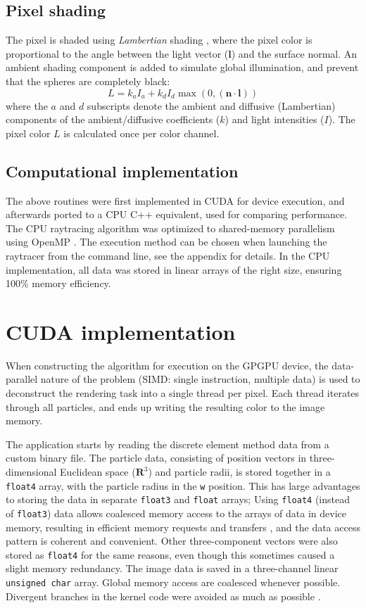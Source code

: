 \documentclass[journal]{IEEEtran}
\begin{document}
\subsection{Pixel shading}
The pixel is shaded using \emph{Lambertian} shading \cite{Shirley:2009}, where the pixel color is proportional to the angle between the light vector ($\mathbf{l}$) and the surface normal. An ambient shading component is added to simulate global illumination, and prevent that the spheres are completely black:
\begin{equation}
  L = k_a I_a + k_d I_d \max(0,(\mathbf{n}\cdot\mathbf{l}))
  \label{eq:shading}
\end{equation}
where the $a$ and $d$ subscripts denote the ambient and diffusive (Lambertian) components of the ambient/diffusive coefficients ($k$) and light intensities ($I$). The pixel color $L$ is calculated once per color channel.


\subsection{Computational implementation}
The above routines were first implemented in CUDA for device execution, and afterwards ported to a CPU C++ equivalent, used for comparing performance. The CPU raytracing algorithm was optimized to shared-memory parallelism using OpenMP \cite{Chapman:2007}. The execution method can be chosen when launching the raytracer from the command line, see the appendix for details. In the CPU implementation, all data was stored in linear arrays of the right size, ensuring 100\% memory efficiency.


\section{CUDA implementation}
When constructing the algorithm for execution on the GPGPU device, the data-parallel nature of the problem (SIMD: single instruction, multiple data) is used to deconstruct the rendering task into a single thread per pixel. Each thread iterates through all particles, and ends up writing the resulting color to the image memory.

The application starts by reading the discrete element method data from a custom binary file. The particle data, consisting of position vectors in three-dimensional Euclidean space ($\mathbf{R}^3$) and particle radii, is stored together in a \texttt{float4} array, with the particle radius in the \texttt{w} position. This has large advantages to storing the data in separate \texttt{float3} and \texttt{float} arrays; Using \texttt{float4} (instead of \texttt{float3}) data allows coalesced memory access \cite{Nvidia-2:2010} to the arrays of data in device memory, resulting in efficient memory requests and transfers \cite{Nyland:2007}, and the data access pattern is coherent and convenient. Other three-component vectors were also stored as \texttt{float4} for the same reasons, even though this sometimes caused a slight memory redundancy. The image data is saved in a three-channel linear \texttt{unsigned char} array. Global memory access are coalesced whenever possible.
Divergent branches in the kernel code were avoided as much as possible \cite{Nvidia-2:2010}.
\end{document}
